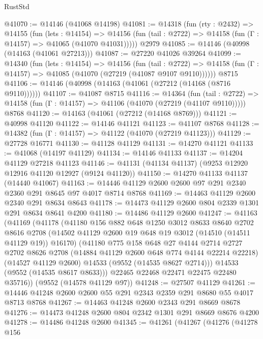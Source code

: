 \begin{lexlean}{RustStd}
\begin{coremodule}
@41070 := @14146 (@41068 @14198)
@41081 := @14318
    (fun (rty : @2432) =>
    @14155
      (fun (lets : @14154) =>
      @14156 (fun (tail : @2722) => @14158 (fun (Γ : @14157) => @41065 (@41070 @41031)))))
    @2979
@41085 := @14146 (@40998 (@14163 (@41061 @27213)))
@41087 := @27220 @41026 @39264
@41099 := @14340
    (fun (lets : @14154) =>
    @14156
      (fun (tail : @2722) =>
      @14158 (fun (Γ : @14157) => @41085 (@41070 (@27219 (@41087 @9107 @9110))))))
    @8715
@41106 := @14146 (@40998 (@14163 (@41061 (@27212 (@14168 (@8716 @9110))))))
@41107 := @41087 @8715
@41116 := @14364
    (fun (tail : @2722) => @14158 (fun (Γ : @14157) => @41106 (@41070 (@27219 (@41107 @9110)))))
    @8768
@41120 := @14163 (@41061 (@27212 (@14168 @8769)))
@41121 := @40998 @41120
@41122 := @14146 @41121
@41123 := @41107 @8768
@41128 := @14382 (fun (Γ : @14157) => @41122 (@41070 (@27219 @41123)))
@41129 := @27728 @16771
@41130 := @41128 @41129
@41131 := @14270 @41121
@41133 := @41068 (@14197 @41129)
@41134 := @14146 @41133
@41137 := @14204 @41129 @27218 @41123
@41146 := @41131 (@41134 @41137) (@9253 @12920 @12916 @41120 @12927 (@9124 @41120))
@41150 := @14270 @41133 @41137 (@14440 @41067)
@41163 := @14446 @41129 @2600 @2600 @97 @291 @2340 @2360 @291 @8645 @97 @4017 @8714 @8768
@41169 := @14463 @41129 @2600 @2340 @291 @8634 @8643
@41178 := @14473 @41129 @2600 @804 @2339 @1301 @291 @8634 @8641 @4200
@41180 := @14486 @41129 @2600
@41247 := @41163
    (@41169
      (@41178
        (@41180
          @156
          @882
          @648
          @1250
          @3012
          @8633
          @8640
          @2702
          @8616
          @2708
          (@14502 @41129 @2600 @19 @648 @19 @3012 (@14510 (@14511 @41129 @19)) @16170)
          (@41180
            @775
            @158
            @648
            @27
            @4144
            @2714
            @2727
            @2702
            @8626
            @2708
            (@14884 @41129 @2600 @648 @774 @4144 @22214 @22218)
            (@14527 @41129 @2600)
            @14533
            (@9552 (@14535 @8627 @2714)))
          @14533
          (@9552 (@14535 @8617 @8633)))
        @22465
        @22468
        @22471
        @22475
        @22480
        @35716))
    (@9552 (@14578 @41129 @97))
@41248 := @27507 @41129
@41261 := @14446 @41248 @2600 @2600 @55 @291 @2343 @2359 @291 @8680 @55 @4017 @8713 @8768
@41267 := @14463 @41248 @2600 @2343 @291 @8669 @8678
@41276 := @14473 @41248 @2600 @804 @2342 @1301 @291 @8669 @8676 @4200
@41278 := @14486 @41248 @2600
@41345 := @41261
    (@41267
      (@41276
        (@41278
          @156

\end{coremodule}
\end{lexlean}

